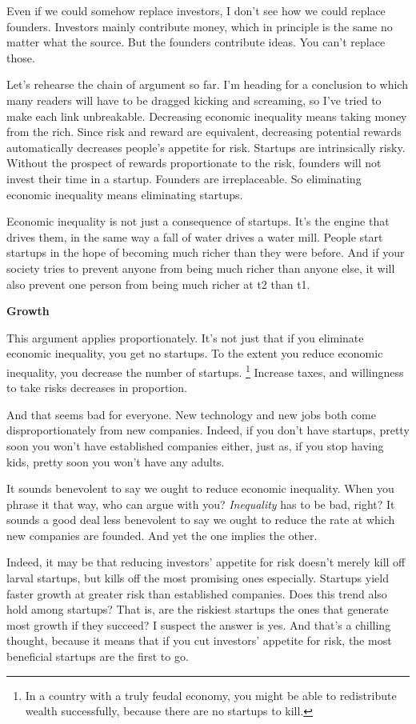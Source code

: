 \documentclass[12pt]{book}
\begin{document}
Even if we could somehow replace investors, I don't see how we could
replace founders. Investors mainly contribute money, which in principle
is the same no matter what the source. But the founders contribute
ideas. You can't replace those.

Let's rehearse the chain of argument so far. I'm heading for a
conclusion to which many readers will have to be dragged kicking and
screaming, so I've tried to make each link unbreakable. Decreasing
economic inequality means taking money from the rich. Since risk and
reward are equivalent, decreasing potential rewards automatically
decreases people's appetite for risk. Startups are intrinsically risky.
Without the prospect of rewards proportionate to the risk, founders will
not invest their time in a startup. Founders are irreplaceable. So
eliminating economic inequality means eliminating startups.

Economic inequality is not just a consequence of startups. It's the
engine that drives them, in the same way a fall of water drives a water
mill. People start startups in the hope of becoming much richer than
they were before. And if your society tries to prevent anyone from being
much richer than anyone else, it will also prevent one person from being
much richer at t2 than t1.

\textbf{Growth}

This argument applies proportionately. It's not just that if you
eliminate economic inequality, you get no startups. To the extent you
reduce economic inequality, you decrease the number of startups.
\footnote{In a country with a truly feudal economy, you might be able to
redistribute wealth successfully, because there are no startups to kill.} Increase taxes, and willingness to take risks
decreases in proportion.

And that seems bad for everyone. New technology and new jobs both come
disproportionately from new companies. Indeed, if you don't have
startups, pretty soon you won't have established companies either, just
as, if you stop having kids, pretty soon you won't have any adults.

It sounds benevolent to say we ought to reduce economic inequality. When
you phrase it that way, who can argue with you? \emph{Inequality} has to
be bad, right? It sounds a good deal less benevolent to say we ought to
reduce the rate at which new companies are founded. And yet the one
implies the other.

Indeed, it may be that reducing investors' appetite for risk doesn't
merely kill off larval startups, but kills off the most promising ones
especially. Startups yield faster growth at greater risk than
established companies. Does this trend also hold among startups? That
is, are the riskiest startups the ones that generate most growth if they
succeed? I suspect the answer is yes. And that's a chilling thought,
because it means that if you cut investors' appetite for risk, the most
beneficial startups are the first to go.
\end{document}
